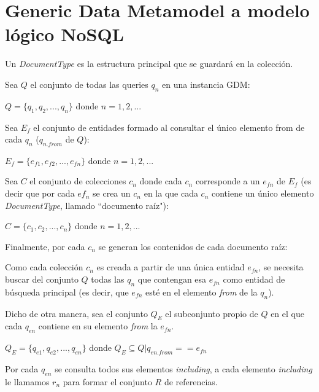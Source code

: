 \section{Generic Data Metamodel a modelo lógico NoSQL}

Un \textit{DocumentType} es la estructura principal que se guardará en la colección.


Sea $Q$ el conjunto de todas las queries $q_{n}$ en una instancia GDM:

\begin{center}
    $Q = \{q_{1}, q_{2},..., q_{n}\}$ donde $n=1,2,...$    
\end{center}

Sea $E_{f}$ el conjunto de entidades formado al consultar el único elemento from de cada $q_n$ ($q_{n.from}$ de $Q$): 

\begin{center}
    $ E_{f} = \{e_{f1},e_{f2},...,e_{fn}\} $ donde $n=1,2,...$    
\end{center}


Sea $C$ el conjunto de colecciones $c_{n}$ donde cada $c_{n}$ corresponde a un $e_{fn}$ de $E_{f}$ (es decir que por cada $ef_{n}$ se crea un $c_{n}$ en la que cada $c_{n}$ contiene un único elemento \textit{DocumentType}, llamado ``documento raíz"):

\begin{center}
    $C = \{ c_{1},c_{2},...,c_{n}\}$ donde $n=1,2,...$    
\end{center}

Finalmente, por cada $c_{n}$ se generan los contenidos de cada documento raíz:

Como cada colección $c_{n}$ es creada a partir de una única entidad $e_{fn}$, se necesita buscar del conjunto $Q$ todas las $q_{n}$ que contengan esa $e_{fn}$ como entidad de búsqueda principal (es decir, que $e_{fn}$ esté en el elemento \textit{from} de la $q_{n}$).


Dicho de otra manera, sea el conjunto $Q_{E}$ el subconjunto propio de $Q$ en el que cada $q_{en}$ contiene en su elemento \textit{from} la $e_{fn}$.
\begin{center}
    $Q_{E} = \{q_{e1},q_{e2},...,q_{en}\}$ donde $Q_{E} \subseteq Q  | q_{en.from} == e_{fn}$
\end{center}

Por cada $q_{en}$ se consulta todos sus elementos \textit{including}, a cada elemento \textit{including} le llamamos $r_{n}$ para formar el conjunto $R$ de referencias.

